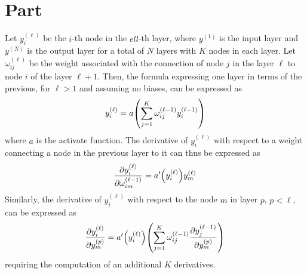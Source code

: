 \documentclass{article}
\newcommand{\enterproblemHeader}[1]{
}
\newcommand{\exitproblemHeader}[1]{
}
\newcounter{problem} %
\newcommand{\problemName}{}
\newenvironment{problem}[1][Part \theproblem]{ %
	\stepcounter{problem} %
	\renewcommand{\problemName}{#1} %
	\section{\problemName} %
	\enterproblemHeader{\problemName} %
}{
	\exitproblemHeader{\problemName} %
}
\begin{document}
\begin{problem}
	Let \(y_i^{(\ell)}\) be the \(i\)-th node in the \(ell\)-th layer, where \(y^{(1)}\) is the input layer and \(y^{(N)}\) is the output layer for a total of \(N\) layers with \(K\) nodes in each layer. Let \(\omega_{ij}^{(\ell)}\) be the weight associated with the connection of node \(j\) in the layer \(\ell\) to node \(i\) of the layer \(\ell + 1\). Then, the formula expressing one layer in terms of the previous, for \(\ell  > 1\) and assuming no biases, can be expressed as
	\begin{equation*}
		y_i^{(\ell)} = a\qty(\sum_{j=1}^K \omega_{ij}^{(\ell - 1)} y_i^{(\ell - 1)})
	\end{equation*}
	where \(a\) is the activate function. The derivative of \(y_i^{(\ell)}\) with respect to a weight connecting a node in the previous layer to it can thus be expressed as
	\begin{equation}\label{eq:dw}
		\pdv{y_i^{(\ell)}}{\omega_{im}^{(\ell - 1)}} = a'\qty(y_i^{(\ell)})y_m^{(\ell)}
	\end{equation}
	Similarly, the derivative of \(y_i^{(\ell)}\) with respect to the node \(m\) in layer \(p\), \(p < \ell\), can be expressed as
	\begin{equation}\label{eq:dy}
		\pdv{y_i^{(\ell)}}{y_m^{(p)}} = a'\qty(y_i^{(\ell)})\qty(\sum_{j=1}^K \omega_{ij}^{(\ell - 1)} \pdv{y_j^{(\ell - 1)}}{y_m^{(p)}})
	\end{equation}
	requiring the computation of an additional \(K\) derivatives.
	

\end{problem}
\end{document}
